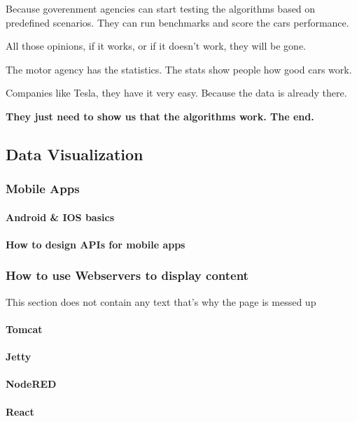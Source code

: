 \documentclass[12pt]{scrartcl} %
\begin{document}
Because goverenment agencies can start testing the algorithms based on predefined scenarios. They can run benchmarks and score the cars performance.

All those opinions, if it works, or if it doesn’t work, they will be gone.

The motor agency has the statistics. The stats show people how good cars work.

Companies like Tesla, they have it very easy. Because the data is already there.

\textbf{They just need to show us that the algorithms work. The end.}


\subsection{Data Visualization}

\subsubsection{Mobile Apps}

\paragraph{Android \& IOS basics}
\paragraph{How to design APIs for mobile apps}

\subsubsection{How to use Webservers to display content}
This section does not contain any text that's why the page is messed up
\paragraph{Tomcat}
\paragraph{Jetty}
\paragraph{NodeRED}
\paragraph{React}
\end{document}
